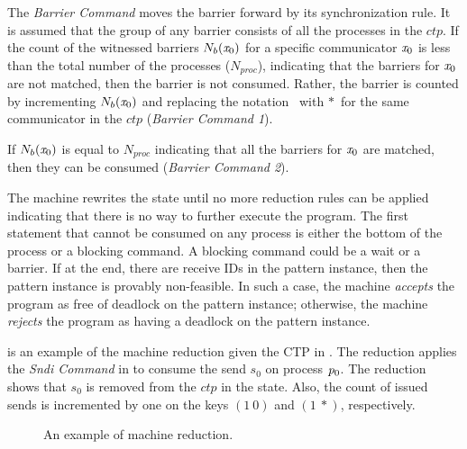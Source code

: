 The \emph{Barrier Command} moves the barrier forward by its synchronization rule. It is assumed that the group of any barrier consists of all the processes in the $\mathit{ctp}$. 
If the count of the witnessed barriers $\textit{$N_b$}(\mathit{x}_0)$ for a specific communicator $\mathit{x}_0$ is less than the total number of the processes ($N_{proc}$), indicating that the barriers for $\mathit{x}_0$ are not matched, then the barrier is not consumed. Rather, the barrier is counted by incrementing $\textit{$N_b$}(\mathit{x}_0)$ and replacing the notation \barrier\ with $\ast$\barrier\ for the same communicator in the $\mathit{ctp}$ (\emph{Barrier Command 1}). 

If $\textit{$N_b$}(\mathit{x}_0)$ is equal to $N_{proc}$ indicating that all the barriers for $\mathit{x}_0$ are matched, then they can be consumed (\emph{Barrier Command 2}).

The machine rewrites the state until no more reduction rules can be applied indicating that there is no way to further execute the program. The first statement that cannot be consumed on any process is either the bottom of the process or a blocking command. A blocking command could be a wait or a barrier. If at the end, there are receive IDs in the pattern instance, then the pattern instance is provably non-feasible. In such a case, the machine \emph{accepts} the program as free of deadlock on the pattern instance; otherwise, the machine \emph{rejects} the program as having a deadlock on the pattern instance.

 is an example of the machine reduction given the CTP in . The reduction applies the \emph{Sndi Command} in  to consume the send $s_0$ on process $\mathit{p}_0$. The reduction shows that $s_0$ is removed from the $ctp$ in the state. Also, the count of issued sends is incremented by one on the keys $(1\ 0)$ and $(1\ \ast)$, respectively.

\begin{figure*}[tb]
\centering
{}
\caption{An example of machine reduction. }
\label{fig:machineexample}
\end{figure*}

